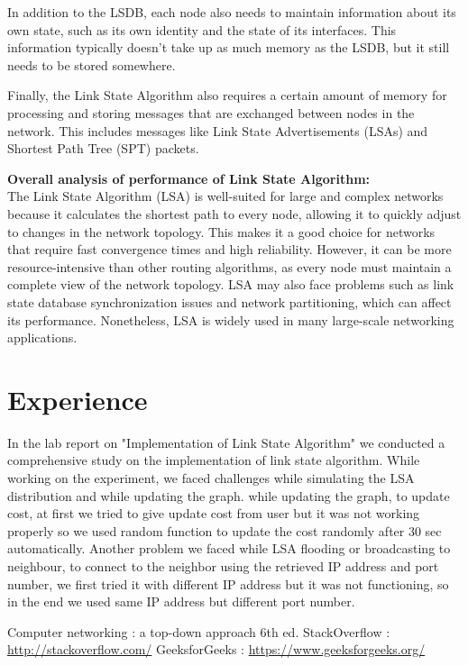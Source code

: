 \documentclass[11pt]{article}
\begin{document}
In addition to the LSDB, each node also needs to maintain information about its own state, such as its own identity and the state of its interfaces. This information typically doesn't take up as much memory as the LSDB, but it still needs to be stored somewhere.

Finally, the Link State Algorithm also requires a certain amount of memory for processing and storing messages that are exchanged between nodes in the network. This includes messages like Link State Advertisements (LSAs) and Shortest Path Tree (SPT) packets.

 \textbf{Overall analysis of performance of Link State Algorithm: }\\[12pt]
 
 The Link State Algorithm (LSA) is well-suited for large and complex networks because it calculates the shortest path to every node, allowing it to quickly adjust to changes in the network topology. This makes it a good choice for networks that require fast convergence times and high reliability. However, it can be more resource-intensive than other routing algorithms, as every node must maintain a complete view of the network topology. LSA may also face problems such as link state database synchronization issues and network partitioning, which can affect its performance. Nonetheless, LSA is widely used in many large-scale networking applications.


\section{Experience}
In the lab report on "Implementation of Link State Algorithm" we conducted a comprehensive study on the implementation of link state algorithm. While working on the experiment, we faced challenges while simulating the LSA distribution and while updating the graph. while updating the graph, to update cost, at first we tried to give update cost from user but it was not working properly so we used random function to update the cost randomly after 30 sec automatically. Another problem we faced while LSA flooding or broadcasting to neighbour, to connect to the neighbor using the retrieved IP address and port number, we first tried it with different IP address but it was not functioning, so in the end we used same IP address but different port number.



\begin{thebibliography}{1}
  Computer networking : a top-down approach 6th ed.
 StackOverflow : \url{http://stackoverflow.com/}
 GeeksforGeeks : \url{https://www.geeksforgeeks.org/}
\end{thebibliography}
\end{document}
